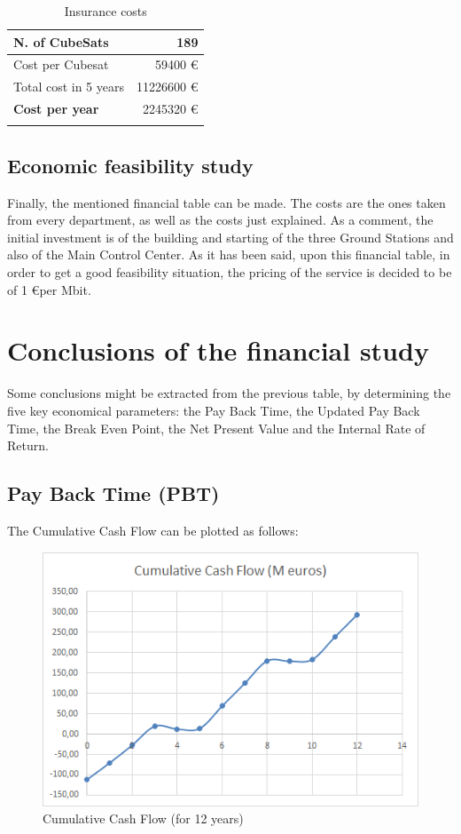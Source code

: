 \begin{longtable}{| l | r |}
  \hline
	N. of CubeSats & 189 \\
  \hline
    Cost per Cubesat & 59400 \euro  \\
  \hline
    Total cost in 5 years & 11226600 \euro \\
  \hline
  	\textbf{Cost per year} & 2245320 \euro \\
  \hline
\caption[Insurance costs]{Insurance costs}
\end{longtable}

\subsection{Economic feasibility study}

Finally, the mentioned financial table can be made. The costs are the ones taken from every department, as well as the costs just explained. As a comment, the initial investment is of the building and starting of the three Ground Stations and also of the Main Control Center. As it has been said, upon this financial table, in order to get a good feasibility situation, the pricing of the service is decided to be of 1 \euro  per Mbit. 



\section{Conclusions of the financial study}
Some conclusions might be extracted from the previous table, by determining the five key economical parameters: the Pay Back Time, the Updated Pay Back Time, the Break Even Point, the Net Present Value and the Internal Rate of Return. 

\subsection{Pay Back Time (PBT)}
The Cumulative Cash Flow can be plotted as follows:

\begin{figure}[H]
	\centering
	\includegraphics{CCF.png}
	\caption[Cumulative Cash Flow]{Cumulative Cash Flow (for 12 years)}
\end{figure}

